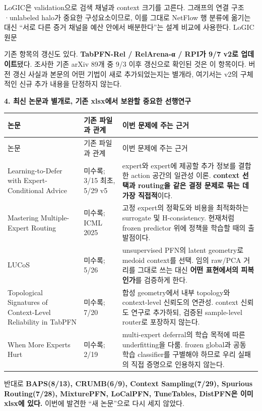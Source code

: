 LoGIC은 validation으로 검색 채널과 context 크기를 고른다. 그래프의 연결 구조·unlabeled halo가 중요한 구성요소이므로, 이를 그대로 NetFlow 행 분류에 옮기는 대신 “서로 다른 증거 채널을 예산 안에서 배분한다”는 설계 비교에 사용한다. LoGIC 원문

기존 항목의 갱신도 있다. \textbf{TabPFN-Rel /\allowbreak{} RelArena-α /\allowbreak{} RPI가 9/\allowbreak{}7 v2로 업데이트}됐다. 조사한 기존 arXiv 89개 중 9/\allowbreak{}3 이후 갱신으로 확인된 것은 이 항목이다. 버전 갱신 사실과 본문의 어떤 기법이 새로 추가되었는지는 별개라, 여기서는 v2의 구체적인 신규 추가 내용을 단정하지 않는다.

\textbf{4. 최신 논문과 별개로, 기존 xlsx에서 보완할 중요한 선행연구}

\begingroup
\footnotesize
\begin{longtable}{>{\raggedright\arraybackslash}p{}>{\raggedright\arraybackslash}p{}>{\raggedright\arraybackslash}p{}}
\toprule
논문 & 기존 파일과 관계 & 이번 문제에 주는 근거 \\ \midrule
\endfirsthead
논문 & 기존 파일과 관계 & 이번 문제에 주는 근거 \\ \midrule
\endhead
{}Learning-to-Defer with Expert-Conditional Advice & 미수록; 3/\allowbreak{}15 최초, 5/\allowbreak{}29 v5 & expert와 expert에 제공할 추가 정보를 결합한 action 공간의 일관성 이론. \textbf{context 선택과 routing을 같은 결정 문제로 묶는 데 가장 직접적}이다. \\
{}Mastering Multiple-Expert Routing & 미수록; ICML 2025 & 고정 expert의 정확도와 비용을 최적화하는 surrogate 및 H-consistency. 현재처럼 frozen predictor 위에 정책을 학습할 때의 출발점이다. \\
{}LUCoS & 미수록; 5/\allowbreak{}26 & unsupervised PFN의 latent geometry로 medoid context를 선택. 임의 raw/\allowbreak{}PCA 거리를 그대로 쓰는 대신 \textbf{어떤 표현에서의 피복인가}를 검증하게 한다. \\
{}Topological Signatures of Context-Level Reliability in TabPFN & 미수록; 7/\allowbreak{}20 & 합성 geometry에서 내부 topology와 context-level 신뢰도의 연관성. context 신뢰도 연구로 추가하되, 검증된 sample-level router로 포장하지 않는다. \\
{}When More Experts Hurt & 미수록; 2/\allowbreak{}19 & multi-expert deferral의 학습 목적에 따른 underfitting을 다룸. frozen global과 공동 학습 classifier를 구별해야 하므로 우리 실패의 직접 증명으로 인용하지 않는다. \\
\bottomrule
\end{longtable}
\endgroup
반대로 \textbf{BAPS(8/\allowbreak{}13), CRUMB(6/\allowbreak{}9), Context Sampling(7/\allowbreak{}29), Spurious Routing(7/\allowbreak{}28), MixturePFN, LoCalPFN, TuneTables, DistPFN은 이미 xlsx에 있다.} 이번에 발견한 “새 논문”으로 다시 세지 않았다.

